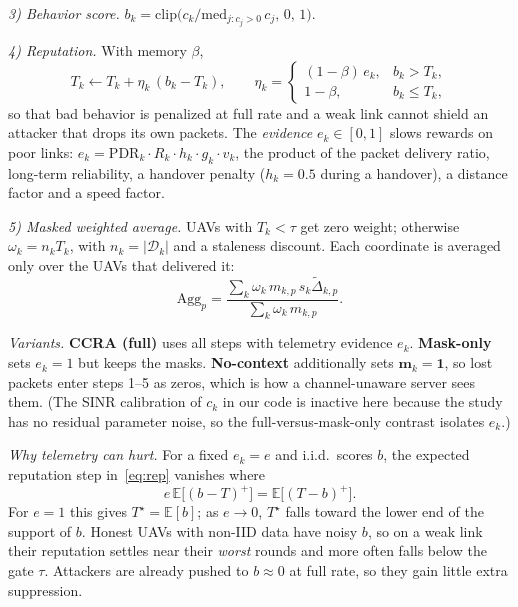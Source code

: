 \documentclass[journal]{IEEEtran}
\begin{document}
\emph{3) Behavior score.} $b_k=\mathrm{clip}\bigl(c_k/\mathrm{med}_{j:c_j>0}\,c_j,\,0,\,1\bigr)$.

\emph{4) Reputation.} With memory $\beta$,
\begin{equation}
  T_k \leftarrow T_k + \eta_k\,(b_k-T_k),\qquad
  \eta_k=\begin{cases}(1-\beta)\,e_k, & b_k>T_k,\\ 1-\beta, & b_k\le T_k,\end{cases}
  \label{eq:rep}
\end{equation}
so that bad behavior is penalized at full rate and a weak link cannot shield an
attacker that drops its own packets. The \emph{evidence} $e_k\in[0,1]$ slows rewards
on poor links:
$e_k=\mathrm{PDR}_k\cdot R_k\cdot h_k\cdot g_k\cdot v_k$, the product of the packet
delivery ratio, long-term reliability, a handover penalty ($h_k=0.5$ during a
handover), a distance factor and a speed factor.

\emph{5) Masked weighted average.} UAVs with $T_k<\tau$ get zero weight; otherwise
$\omega_k=n_kT_k$, with $n_k=|\mathcal{D}_k|$ and a staleness discount. Each coordinate
is averaged only over the UAVs that delivered it:
\begin{equation}
  \mathrm{Agg}_p=\frac{\sum_k \omega_k\, m_{k,p}\, s_k\tilde\Delta_{k,p}}{\sum_k \omega_k\, m_{k,p}}.
\end{equation}

\emph{Variants.} \textbf{CCRA (full)} uses all steps with telemetry evidence $e_k$.
\textbf{Mask-only} sets $e_k=1$ but keeps the masks. \textbf{No-context} additionally sets
$\mathbf{m}_k=\mathbf{1}$, so lost packets enter steps 1--5 as zeros, which is how a
channel-unaware server sees them. (The SINR calibration of $c_k$ in our code is inactive
here because the study has no residual parameter noise, so the full-versus-mask-only
contrast isolates $e_k$.)

\emph{Why telemetry can hurt.} For a fixed $e_k=e$ and i.i.d.\ scores $b$, the expected
reputation step in~\eqref{eq:rep} vanishes where
\begin{equation}
  e\,\mathbb{E}\bigl[(b-T)^+\bigr]=\mathbb{E}\bigl[(T-b)^+\bigr].
  \label{eq:fixed}
\end{equation}
For $e=1$ this gives $T^\star=\mathbb{E}[b]$; as $e\to0$, $T^\star$ falls toward the
lower end of the support of $b$. Honest UAVs with non-IID data have noisy $b$, so
on a weak link their reputation settles near their \emph{worst} rounds and more often
falls below the gate $\tau$. Attackers are already pushed to $b\approx0$ at full rate,
so they gain little extra suppression.
\end{document}
